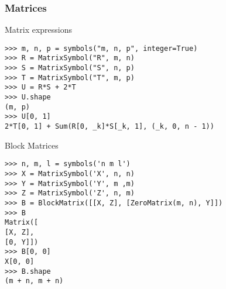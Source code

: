 \subsubsection{Matrices}

\noindent Matrix expressions
\begin{verbatim}
>>> m, n, p = symbols("m, n, p", integer=True)
>>> R = MatrixSymbol("R", m, n)
>>> S = MatrixSymbol("S", n, p)
>>> T = MatrixSymbol("T", m, p)
>>> U = R*S + 2*T
>>> U.shape
(m, p)
>>> U[0, 1]
2*T[0, 1] + Sum(R[0, _k]*S[_k, 1], (_k, 0, n - 1))
\end{verbatim}

\noindent Block Matrices
\begin{verbatim}
>>> n, m, l = symbols('n m l')
>>> X = MatrixSymbol('X', n, n)
>>> Y = MatrixSymbol('Y', m ,m)
>>> Z = MatrixSymbol('Z', n, m)
>>> B = BlockMatrix([[X, Z], [ZeroMatrix(m, n), Y]])
>>> B
Matrix([
[X, Z],
[0, Y]])
>>> B[0, 0]
X[0, 0]
>>> B.shape
(m + n, m + n)
\end{verbatim}
